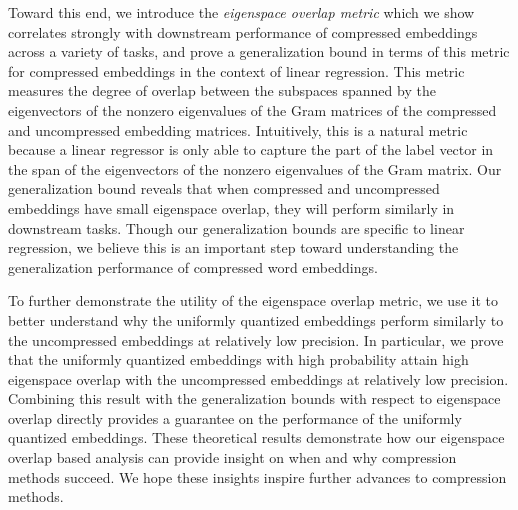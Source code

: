 Toward this end, we introduce the \textit{eigenspace overlap metric} which we show correlates strongly with downstream performance of compressed embeddings across a variety of tasks, and prove a generalization bound in terms of this metric for compressed embeddings in the context of linear regression.
This metric measures the degree of overlap between the subspaces spanned by the eigenvectors of the nonzero eigenvalues of the Gram matrices of the compressed and uncompressed embedding matrices. %
Intuitively, this is a natural metric because a linear regressor is only able to capture the part of the label vector in the span of the eigenvectors of the nonzero eigenvalues of the Gram matrix.
Our generalization bound reveals that when compressed and uncompressed embeddings have small eigenspace overlap, they will perform similarly in downstream tasks.
Though our generalization bounds are specific to linear regression, we believe this is an important step toward understanding the generalization performance of compressed word embeddings.

To further demonstrate the utility of the eigenspace overlap metric, we use it to better understand why the uniformly quantized embeddings perform similarly to the uncompressed embeddings at relatively low precision.
In particular, we prove that the uniformly quantized embeddings with high probability attain high eigenspace overlap with the uncompressed embeddings at relatively low precision.
Combining this result with the generalization bounds with respect to eigenspace overlap directly provides a guarantee on the performance of the uniformly quantized embeddings.
These theoretical results demonstrate how our eigenspace overlap based analysis can provide insight on when and why compression methods succeed.
We hope these insights inspire further advances to compression methods.



